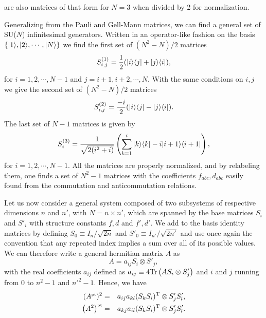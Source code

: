 are also matrices of that form for $N=3$ when divided by 2 for normalization.

Generalizing from the Pauli and Gell-Mann matrices, we can find a general set of SU($N$) infinitesimal generators. Written in an operator-like fashion on the basis $\{ | 1 \rangle, | 2 \rangle, \cdots, | N \rangle \}$ we find the first set of $(N^2-N)/2$ matrices
\[ S^{(1)}_{i,j} =\frac 1 2 ( | i \rangle \langle j | + | j \rangle \langle i | ) ,\]
for $i=1,2,\cdots, N-1$ and $j=i+1,i+2,\cdots, N$. With the same conditions on $i,j$ we give the second set of  $(N^2-N)/2$ matrices
\[ S^{(2)}_{i,j} =\frac{-i}2 ( | i \rangle \langle j | - | j \rangle \langle i | ).\]
The last set of $N-1$ matrices is given by
\[ S^{(3)}_{i} =\frac{1}{\sqrt{2(i^2+i)}} \left( \sum_{k=1}^i | k \rangle \langle k | - i | i+1 \rangle \langle i+1 | \right),\]
for $i=1,2,\cdots, N-1$. All the matrices are properly normalized, and by relabeling them, one finds a set of $N^2-1$ matrices with the coefficients $f_{abc}, d_{abc}$ easily found from the commutation and anticommutation relations.

Let us now consider a general system composed of two subsystems of respective dimensions $n$ and $n'$, with $N=n\times n'$, which are spanned by the base matrices $S_i$ and $S'_i$ with structure constants $f, d$ and $f', d'$. We add to the basis identity matrices by defining $S_0 \equiv I_n / \sqrt{2n}$ and $S'_0\equiv I_{n'}/ \sqrt{2n'}$ and use once again the convention that any repeated index implies a sum over all of its possible values. We can therefore write a general hermitian matrix $A$ as
\[ A = a_{ij} S_i \otimes S'_j, \]
with the real coefficients $a_{ij}$ defined as $a_{ij} \equiv 4 \mbox{\textup{Tr}}\left( A S_i \otimes S'_j \right)$ and $i$ and $j$ running from 0 to $n^2-1$ and ${n'}^2-1$. Hence, we have
\begin{eqnarray}
  (A^{\mbox{\tiny \textup{pt}}})^2 &=& a_{ij} a_{kl} (S_k S_i)^{\textrm{T}} \otimes S'_j S'_l, \label{eq-Apt2}\\
  \left(A^2 \right)^{\mbox{\tiny \textup{pt}}} &=& a_{kj} a_{il}  (S_k S_i)^{\textrm{T}}  \otimes S'_j S'_l. \label{eq-A2pt}
\end{eqnarray}

